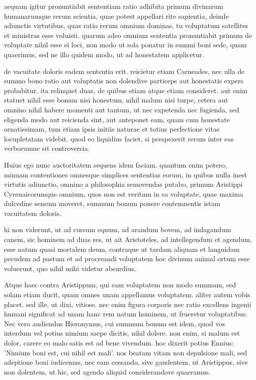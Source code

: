  aequam igitur pronuntiabit sententiam ratio adhibita primum divinarum humanarumque rerum scientia, quae potest appellari rite sapientia, deinde adiunctis virtutibus, quas ratio rerum omnium dominas, tu voluptatum satellites et ministras esse voluisti. quarum adeo omnium sententia pronuntiabit primum de voluptate nihil esse ei loci, non modo ut sola ponatur in summi boni sede, quam quaerimus, sed ne illo quidem modo, ut ad honestatem applicetur.

 de vacuitate doloris eadem sententia erit. reicietur etiam Carneades, nec ulla de summo bono ratio aut voluptatis non dolendive particeps aut honestatis expers probabitur. ita relinquet duas, de quibus etiam atque etiam consideret. aut enim statuet nihil esse bonum nisi honestum, nihil malum nisi turpe, cetera aut omnino nihil habere momenti aut tantum, ut nec expetenda nec fugienda, sed eligenda modo aut reicienda sint, aut anteponet eam, quam cum honestate ornatissimam, tum etiam ipsis initiis naturae et totius perfectione vitae locupletatam videbit. quod eo liquidius faciet, si perspexerit rerum inter eas verborumne sit controversia.

 Huius ego nunc auctoritatem sequens idem faciam. quantum enim potero, minuam contentiones omnesque simplices sententias eorum, in quibus nulla inest virtutis adiunctio, omnino a philosophia semovendas putabo, primum Aristippi Cyrenaicorumque omnium, quos non est veritum in ea voluptate, quae maxima dulcedine sensum moveret, summum bonum ponere contemnentis istam vacuitatem doloris.

 hi non viderunt, ut ad cursum equum, ad arandum bovem, ad indagandum canem, sic hominem ad duas res, ut ait Aristoteles, ad intellegendum et agendum, esse natum quasi mortalem deum, contraque ut tardam aliquam et languidam pecudem ad pastum et ad procreandi voluptatem hoc divinum animal ortum esse voluerunt, quo nihil mihi videtur absurdius.

 Atque haec contra Aristippum, qui eam voluptatem non modo summam, sed solam etiam ducit, quam omnes unam appellamus voluptatem. aliter autem vobis placet. sed ille, ut dixi, vitiose. nec enim figura corporis nec ratio excellens ingenii humani significat ad unam hanc rem natum hominem, ut frueretur voluptatibus. Nec vero audiendus Hieronymus, cui summum bonum est idem, quod vos interdum vel potius nimium saepe dicitis, nihil dolere. non enim, si malum est dolor, carere eo malo satis est ad bene vivendum. hoc dixerit potius Ennius: 'Nimium boni est, cui nihil est mali'. nos beatam vitam non depulsione mali, sed adeptione boni iudicemus, nec eam cessando, sive gaudentem, ut Aristippus, sive non dolentem, ut hic, sed agendo aliquid considerandove quaeramus.

